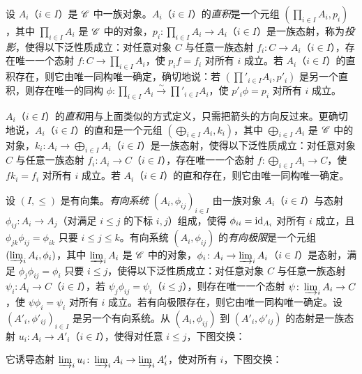 设 $A_i$（$i\in I$）是 $\mathscr{C}$ 中一族对象。$A_i$（$i\in I$）的\emph{直积}是一个元组 $(\prod_{i\in I}A_i,p_i)$，其中 $\prod_{i\in I}A_i$ 是 $\mathscr{C}$ 中的对象，$p_i\colon\prod_{i\in I}A_i\to A_i$（$i\in I$）是一族态射，称为\emph{投影}，使得以下泛性质成立：对任意对象 $C$ 与任意一族态射 $f_i\colon C\to A_i$（$i\in I$），存在唯一一个态射 $f\colon C\to\prod_{i\in I}A_i$，使 $p_if=f_i$ 对所有 $i$ 成立。若 $A_i$（$i\in I$）的直积存在，则它由唯一同构唯一确定，确切地说：若 $(\prod'_{i\in I}A_i,p'_i)$ 是另一个直积，则存在唯一的同构 $\phi\colon\prod_{i\in I}A_i\xrightarrow{\sim}\prod'_{i\in I}A_i$，使 $p'_i\phi=p_i$ 对所有 $i$ 成立。

$A_i$（$i\in I$）的\emph{直和}用与上面类似的方式定义，只需把箭头的方向反过来。更确切地说，$A_i$（$i\in I$）的直和是一个元组 $(\bigoplus_{i\in I}A_i,k_i)$，其中 $\bigoplus_{i\in I}A_i$ 是 $\mathscr{C}$ 中的对象，$k_i\colon A_i\to\bigoplus_{i\in I}A_i$（$i\in I$）是一族态射，使得以下泛性质成立：对任意对象 $C$ 与任意一族态射 $f_i\colon A_i\to C$（$i\in I$），存在唯一一个态射 $f\colon\bigoplus_{i\in I}A_i\to C$，使 $fk_i=f_i$ 对所有 $i$ 成立。若 $A_i$（$i\in I$）的直和存在，则它由唯一同构唯一确定。

设 $(I,\le)$ 是有向集。\emph{有向系统} $(A_i,\phi_{ij})_{i\in I}$ 由一族对象 $A_i$（$i\in I$）与态射 $\phi_{ij}\colon A_i\to A_j$（对满足 $i\le j$ 的下标 $i,j$）组成，使得 $\phi_{ii}=\operatorname{id}_{A_i}$ 对所有 $i$ 成立，且 $\phi_{jk}\phi_{ij}=\phi_{ik}$ 只要 $i\le j\le k$。有向系统 $(A_i,\phi_{ij})$ 的\emph{有向极限}是一个元组 $(\varinjlim_i A_i,\phi_i)$，其中 $\varinjlim_i A_i$ 是 $\mathscr{C}$ 中的对象，$\phi_i\colon A_i\to\varinjlim_i A_i$（$i\in I$）是态射，满足 $\phi_j\phi_{ij}=\phi_i$ 只要 $i\le j$，使得以下泛性质成立：对任意对象 $C$ 与任意一族态射 $\psi_i\colon A_i\to C$（$i\in I$），若 $\psi_j\phi_{ij}=\psi_i$（$i\le j$），则存在唯一一个态射 $\psi\colon\varinjlim_i A_i\to C$，使 $\psi\phi_i=\psi_i$ 对所有 $i$ 成立。若有向极限存在，则它由唯一同构唯一确定。设 $(A'_i,\phi'_{ij})_{i\in I}$ 是另一个有向系统。从 $(A_i,\phi_{ij})$ 到 $(A'_i,\phi'_{ij})$ 的态射是一族态射 $u_i\colon A_i\to A'_i$（$i\in I$），使得对任意 $i\le j$，下图交换：
\begin{center}
\end{center}
它诱导态射 $\varinjlim_i u_i\colon\varinjlim_i A_i\to\varinjlim_i A'_i$，使对所有 $i$，下图交换：
\begin{center}
\end{center}

